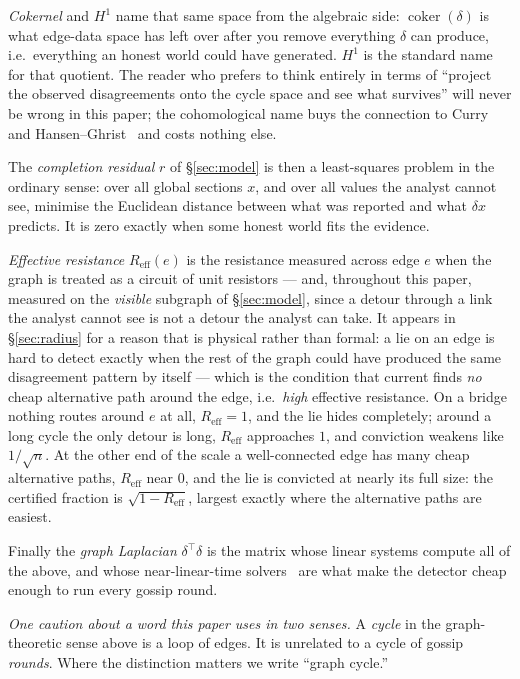 \documentclass[11pt,a4paper]{article}
\begin{document}
\emph{Cokernel} and $H^1$ name that same space from the algebraic side: $\operatorname{coker}(\delta)$ is what edge-data
space has left over after you remove everything $\delta$ can produce, i.e.\ everything an honest world could have generated.
$H^1$ is the standard name for that quotient. The reader who prefers to think entirely in terms of ``project the observed
disagreements onto the cycle space and see what survives'' will never be wrong in this paper; the cohomological name buys
the connection to Curry~\cite{curry} and Hansen--Ghrist~\cite{hansen-ghrist} and costs nothing else.

The \emph{completion residual} $r$ of \S\ref{sec:model} is then a least-squares problem in the ordinary sense: over all
global sections $x$, and over all values the analyst cannot see, minimise the Euclidean distance between what was reported
and what $\delta x$ predicts. It is zero exactly when some honest world fits the evidence.

\emph{Effective resistance} $R_{\mathrm{eff}}(e)$ is the resistance measured across edge $e$ when the graph is treated as a
circuit of unit resistors --- and, throughout this paper, measured on the \emph{visible} subgraph of \S\ref{sec:model}, since
a detour through a link the analyst cannot see is not a detour the analyst can take. It appears in \S\ref{sec:radius} for a
reason that is physical rather than formal: a lie on an edge is hard to detect exactly when the rest of the graph could have
produced the same disagreement pattern by itself --- which is the condition that current finds \emph{no} cheap alternative
path around the edge, i.e.\ \emph{high} effective resistance. On a bridge nothing routes around $e$ at all,
$R_{\mathrm{eff}}=1$, and the lie hides completely; around a long cycle the only detour is long, $R_{\mathrm{eff}}$
approaches $1$, and conviction weakens like $1/\sqrt{n}$. At the other end of the scale a well-connected edge has many cheap
alternative paths, $R_{\mathrm{eff}}$ near $0$, and the lie is convicted at nearly its full size: the certified fraction is
$\sqrt{1-R_{\mathrm{eff}}}$, largest exactly where the alternative paths are easiest.

Finally the \emph{graph Laplacian} $\delta^{\!\top}\delta$ is the matrix whose linear systems compute all of the above, and
whose near-linear-time solvers~\cite{spielman-teng} are what make the detector cheap enough to run every gossip round.

\emph{One caution about a word this paper uses in two senses.} A \emph{cycle} in the graph-theoretic sense above is a loop
of edges. It is unrelated to a cycle of gossip \emph{rounds}. Where the distinction matters we write ``graph cycle.''
\end{document}

